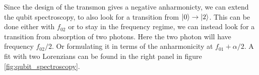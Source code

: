 Since the design of the transmon gives a negative anharmonicty, we can extend the qubit spectroscopy, to also look for a transition from $\ket{0}\to \ket{2}$. This can be done either with $f_{02}$ or to stay in the frequency regime, we can instead look for a transition from absorption of two photons. Here the two photon will have frequency $f_{02} / 2$. Or formulating it in terms of the anharmonicity at $f_{01} + \alpha / 2$. A fit with two Lorenzians can be found in the right panel in figure \ref{fig:qubit_spectroscopy}. 
